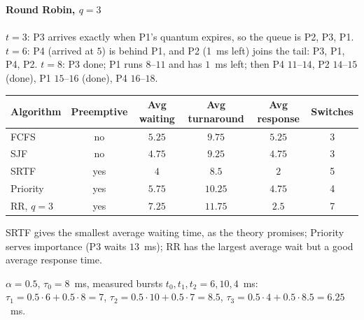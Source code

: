 \documentclass[11pt,a4paper]{article}
\begin{document}
\textbf{Round Robin, $q = 3$}\\[0.2em]
\\[0.3em]
$t=3$: P3 arrives exactly when P1's quantum expires, so the queue is P2, P3, P1. $t=6$: P4 (arrived at $5$) is behind P1, and P2 (1~ms left) joins the tail: P3, P1, P4, P2. $t=8$: P3 done; P1 runs $8$--$11$ and has $1$~ms left; then P4 $11$--$14$, P2 $14$--$15$ (done), P1 $15$--$16$ (done), P4 $16$--$18$.\\
{\small{}}

\begin{center}
\renewcommand{\arraystretch}{1.2}
\begin{tabular}{@{}lccccc@{}}
\toprule
\textbf{Algorithm} & \textbf{Preemptive} & \textbf{Avg waiting} & \textbf{Avg turnaround} & \textbf{Avg response} & \textbf{Switches}\\
\midrule
FCFS & no & $5.25$ & $9.75$ & $5.25$ & 3\\
SJF & no & $4.75$ & $9.25$ & $4.75$ & 3\\
SRTF & yes & $4$ & $8.5$ & $2$ & 5\\
Priority & yes & $5.75$ & $10.25$ & $4.75$ & 4\\
RR, $q=3$ & yes & $7.25$ & $11.75$ & $2.5$ & 7\\
\bottomrule
\end{tabular}
\end{center}
SRTF gives the smallest average waiting time, as the theory promises; Priority serves importance (P3 waits $13$~ms); RR has the largest average wait but a good average response time.

\begin{example}
$\alpha = 0.5$, $\tau_0 = 8$~ms, measured bursts $t_0, t_1, t_2 = 6, 10, 4$~ms: $\tau_1 = 0.5\cdot6 + 0.5\cdot8 = 7$, $\tau_2 = 0.5\cdot10 + 0.5\cdot7 = 8.5$, $\tau_3 = 0.5\cdot4 + 0.5\cdot8.5 = 6.25$~ms.
\end{example}
\end{document}
